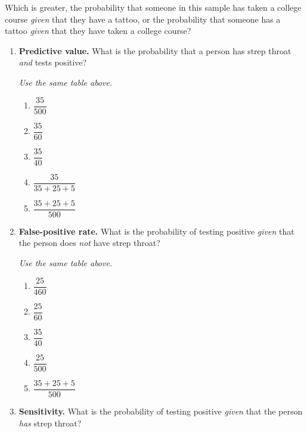 \documentclass{article}
\newcommand{\uses}[1]{}         %
\begin{document}
Which is greater, the probability that someone in this sample has taken a college
course \emph{given} that they have a tattoo, or the probability that someone has
a tattoo \emph{given} that they have taken a college course?


\begin{enumerate}[label=\textbf{S\arabic*.}]

\item \uses{strep-2x2} \textbf{Predictive value.} What is the probability that a person has strep
throat \emph{and} tests positive? 

\textit{Use the same table above.}

\begin{enumerate}
  \item $\dfrac{35}{500}$
  \item $\dfrac{35}{60}$
  \item $\dfrac{35}{40}$
  \item $\dfrac{35}{35+25+5}$
  \item $\dfrac{35+25+5}{500}$
\end{enumerate}

\item \uses{strep-2x2} \textbf{False-positive rate.} What is the probability of testing positive
\emph{given} that the person does \emph{not} have strep throat? 

\textit{Use the same table above.}

\begin{enumerate}
  \item $\dfrac{25}{460}$
  \item $\dfrac{25}{60}$
  \item $\dfrac{35}{40}$
  \item $\dfrac{25}{500}$
  \item $\dfrac{35+25+5}{500}$
\end{enumerate}

\item \uses{strep-2x2} \textbf{Sensitivity.} What is the probability of testing positive
\emph{given} that the person \emph{has} strep throat? 


\end{enumerate}
\end{document}
